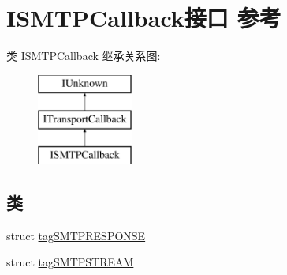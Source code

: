 \hypertarget{interface_i_s_m_t_p_callback}{}\section{I\+S\+M\+T\+P\+Callback接口 参考}
\label{interface_i_s_m_t_p_callback}
类 I\+S\+M\+T\+P\+Callback 继承关系图\+:\begin{figure}[H]
\begin{center}
\leavevmode
\includegraphics[height=3.000000cm]{interface_i_s_m_t_p_callback}
\end{center}
\end{figure}
\subsection*{类}
\begin{DoxyCompactItemize}
\item 
struct \hyperlink{struct_i_s_m_t_p_callback_1_1tag_s_m_t_p_r_e_s_p_o_n_s_e}{tag\+S\+M\+T\+P\+R\+E\+S\+P\+O\+N\+SE}
\item 
struct \hyperlink{struct_i_s_m_t_p_callback_1_1tag_s_m_t_p_s_t_r_e_a_m}{tag\+S\+M\+T\+P\+S\+T\+R\+E\+AM}
\end{DoxyCompactItemize}
